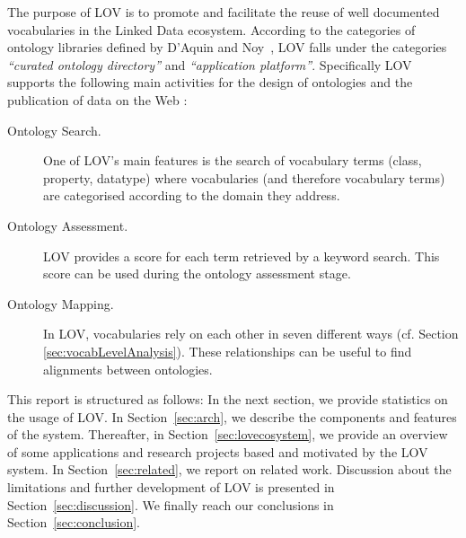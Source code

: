 \documentclass{iosart2c}
\begin{document}
The purpose of LOV is to promote and facilitate the reuse of well documented vocabularies in the Linked Data ecosystem. According to the categories of ontology libraries defined by D'Aquin and Noy~\cite{AquinJoWS12}, LOV falls under the categories \textit{``curated ontology directory''}  and \textit{``application platform''}.  Specifically LOV supports the following main activities for the design of ontologies and the publication of data on the Web \cite{MC10, ohdeploying, pedrinaci2014, villata2012}:

\begin{description}
 \item [Ontology Search.] One of LOV's main features is the search of vocabulary terms (class, property, datatype) where vocabularies (and therefore vocabulary terms) are categorised according to the domain they address.
 \item [Ontology Assessment.] LOV provides a score for each term retrieved by a keyword search. This score can be used during the ontology assessment stage.
 \item [Ontology Mapping.] In LOV, vocabularies rely on each other in seven different ways (cf. Section \ref{sec:vocabLevelAnalysis}). These relationships can be useful to find alignments between ontologies. 
\end{description}






This report is structured as follows: In the next section, we provide statistics on the usage of LOV. In Section~\ref{sec:arch}, we describe the components and features of the system. Thereafter,  in Section~\ref{sec:lovecosystem}, we provide an overview of some applications and research projects based and motivated by the LOV system. In Section~\ref{sec:related}, we report on related work. Discussion about the limitations and further development of LOV is presented in Section~\ref{sec:discussion}. We finally reach our conclusions in Section~\ref{sec:conclusion}.
\end{document}
